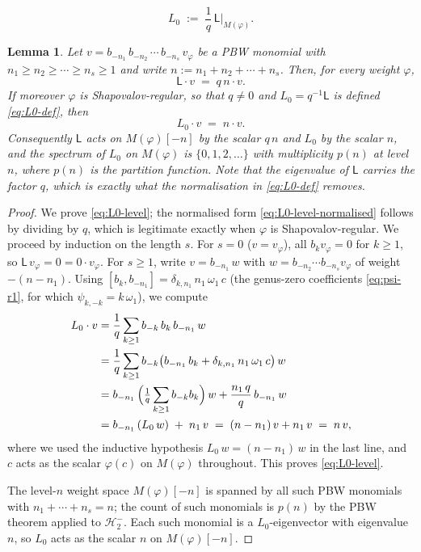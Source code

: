 \documentclass[10pt,a4paper]{amsart}
\newtheorem{lemma}{Lemma}
\newcommand{\Lalg}{{\mathsf{L}}}
\newcommand{\Mf}{M(\varphi)}          %
\newcommand{\vf}{v_\varphi}           %
\begin{document}
\begin{equation}\label{eq:L0-def}
  L_0 \;:=\; \frac{1}{q}\,\Lalg \Big|_{\Mf} .
\end{equation}

\begin{lemma}
\label{lem:L0-level}
Let $v = b_{-n_1}\,b_{-n_2}\,\cdots\,b_{-n_s}\,\vf$ be a PBW monomial
with $n_1\geq n_2\geq\cdots\geq n_s\geq 1$ and write
$n := n_1 + n_2 + \cdots + n_s$. Then, for \emph{every} weight
$\varphi$,
\begin{equation}\label{eq:L0-level}
  \Lalg \cdot v \;=\; q\,n\cdot v .
\end{equation}
If moreover $\varphi$ is Shapovalov-regular, so that $q \neq 0$ and
$L_0 = q^{-1}\Lalg$ is defined \eqref{eq:L0-def}, then
\begin{equation}\label{eq:L0-level-normalised}
  L_0 \cdot v \;=\; n\cdot v .
\end{equation}
Consequently $\Lalg$ acts on $\Mf[-n]$ by the scalar $q\,n$ and $L_0$ by
the scalar $n$, and the spectrum of $L_0$ on $\Mf$ is $\{0,1,2,\dots\}$
with multiplicity $p(n)$ at level $n$, where $p(n)$ is the partition
function. Note that the eigenvalue of $\Lalg$ carries the factor $q$,
which is exactly what the normalisation in \eqref{eq:L0-def} removes.
\end{lemma}

\begin{proof}
We prove \eqref{eq:L0-level}; the normalised form
\eqref{eq:L0-level-normalised} follows by dividing by $q$, which is
legitimate exactly when $\varphi$ is Shapovalov-regular.
We proceed by induction on the length $s$.
For $s=0$ ($v=\vf$), all $b_k\vf = 0$ for $k\geq 1$, so $\Lalg\,\vf = 0
= 0\cdot\vf$.
For $s\geq 1$, write $v = b_{-n_1}\,w$ with $w = b_{-n_2}\cdots b_{-n_s}\vf$
of weight $-(n-n_1)$. Using
$[b_k,b_{-n_1}] = \delta_{k,n_1}\,n_1\,\omega_1\,c$
(the genus-zero coefficients \eqref{eq:psi-r1}, for which
$\psi_{k,-k} = k\,\omega_1$), we compute
\begin{align*}
  L_0 \cdot v
  &= \frac{1}{q}
     \sum_{k\geq 1} b_{-k}\,b_k\,b_{-n_1}\,w \\
  &= \frac{1}{q}
     \sum_{k\geq 1} b_{-k}
       \bigl(b_{-n_1}\,b_k + \delta_{k,n_1}\,n_1\,\omega_1\,c\bigr)\,w \\
  &= b_{-n_1}\,\Bigl(\tfrac{1}{q}\sum_{k\geq 1}b_{-k}b_k\Bigr)\,w
     + \frac{n_1\,q}{q}\,b_{-n_1}\,w \\
  &= b_{-n_1}\,(L_0\,w) \;+\; n_1\,v
   \;=\; (n - n_1)\,v + n_1\,v \;=\; n\,v,
\end{align*}
where we used the inductive hypothesis $L_0\,w = (n-n_1)\,w$ in the last
line, and $c$ acts as the scalar $\varphi(c)$ on $\Mf$ throughout.
This proves \eqref{eq:L0-level}.

The level-$n$ weight space $\Mf[-n]$ is spanned by all such PBW monomials
with $n_1+\cdots+n_s = n$; the count of such monomials is $p(n)$ by the
PBW theorem applied to $\mathcal{H}_2^-$. Each such monomial is a
$L_0$-eigenvector with eigenvalue $n$, so $L_0$ acts as the scalar $n$
on $\Mf[-n]$.
\end{proof}
\end{document}
